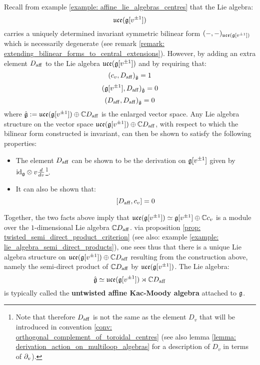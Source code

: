         Recall from example \ref{example: affine_lie_algebras_centres} that the Lie algebra:
            $$\mathfrak{uce}(\mathfrak{g}[v^{\pm 1}])$$
        carries a uniquely determined invariant symmetric bilinear form $(-, -)_{\mathfrak{uce}(\mathfrak{g}[v^{\pm 1}])}$ which is necessarily degenerate (see remark \ref{remark: extending_bilinear_forms_to_central_extensions}). However, by adding an extra element $D_{\mathrm{aff}}$ to the Lie algebra $\mathfrak{uce}(\mathfrak{g}[v^{\pm 1}])$ and by requiring that:
            $$(c_v, D_{\mathrm{aff}})_{\hat{\mathfrak{g}}} = 1$$
            $$(\mathfrak{g}[v^{\pm 1}], D_{\mathrm{aff}})_{\hat{\mathfrak{g}}} = 0$$
            $$(D_{\mathrm{aff}}, D_{\mathrm{aff}})_{\hat{\mathfrak{g}}} = 0$$
        where $\hat{\mathfrak{g}} := \mathfrak{uce}(\mathfrak{g}[v^{\pm 1}]) \oplus \mathbb{C} D_{\mathrm{aff}}$ is the enlarged vector space. Any Lie algebra structure on the vector space $\mathfrak{uce}(\mathfrak{g}[v^{\pm 1}]) \oplus \mathbb{C} D_{\mathrm{aff}}$, with respect to which the bilinear form constructed is invariant, can then be shown to satisfy the following properties:
        \begin{itemize}
            \item The element $D_{\mathrm{aff}}$ can be shown to be the derivation on $\mathfrak{g}[v^{\pm 1}]$ given by $\id_{\g} \tensor v \frac{d}{dv}$\footnote{Note that therefore $D_{\mathrm{aff}}$ is not the same as the element $D_v$ that will be introduced in convention \ref{conv: orthogonal_complement_of_toroidal_centres} (see also lemma \ref{lemma: derivation_action_on_multiloop_algebras} for a description of $D_v$ in terms of $\partial_v$).}.
            \item It can also be shown that:
                $$[D_{\mathrm{aff}}, c_v] = 0$$
        \end{itemize}
        Together, the two facts above imply that $\mathfrak{uce}(\mathfrak{g}[v^{\pm 1}]) \simeq \mathfrak{g}[v^{\pm 1}] \oplus \mathbb{C} c_v$ is a module over the $1$-dimensional Lie algebra $\mathbb{C} D_{\mathrm{aff}}$. via proposition \ref{prop: twisted_semi_direct_product_criterion} (see also: example \ref{example: lie_algebra_semi_direct_products}), one sees thus that there is a unique Lie algebra structure on $\mathfrak{uce}(\mathfrak{g}[v^{\pm 1}]) \oplus \mathbb{C} D_{\mathrm{aff}}$ resulting from the construction above, namely the semi-direct product of $\mathbb{C} D_{\mathrm{aff}}$ by $\mathfrak{uce}(\mathfrak{g}[v^{\pm 1}])$. The Lie algebra:
            $$\hat{\mathfrak{g}} \simeq \mathfrak{uce}(\mathfrak{g}[v^{\pm 1}]) \rtimes \mathbb{C} D_{\mathrm{aff}}$$
        is typically called the \textbf{untwisted affine Kac-Moody algebra} attached to $\mathfrak{g}$.


